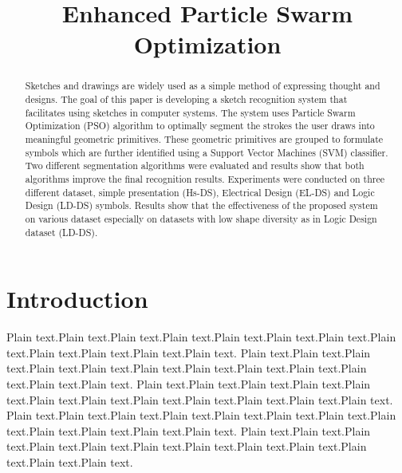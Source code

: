 \documentclass[10pt]{article}
\title{Enhanced Particle Swarm Optimization}
\begin{document}
\maketitle
\begin{abstract}
Sketches and drawings are widely used as a simple method of expressing thought and designs. The goal of this paper is developing a sketch recognition system that facilitates using sketches in computer systems. The system uses Particle Swarm Optimization (PSO) algorithm to optimally segment the strokes the user draws into meaningful geometric primitives.  These geometric primitives are grouped to formulate symbols which are further identified using a Support Vector Machines (SVM) classifier. Two different segmentation algorithms were evaluated and results show that both algorithms improve the final recognition results. Experiments were conducted on three different dataset, simple presentation (Hs-DS), Electrical Design (EL-DS) and Logic Design (LD-DS) symbols. Results show that the effectiveness of the proposed system on various dataset especially on datasets with low shape diversity as in Logic Design dataset (LD-DS).  %
\end{abstract}
\section{Introduction}

 

Plain text.Plain text.Plain text.Plain text.Plain text.Plain text.Plain text.Plain text.Plain text.Plain text.Plain text.Plain text.
Plain text.Plain text.Plain text.Plain text.Plain text.Plain text.Plain text.Plain text.Plain text.Plain text.Plain text.Plain text.
Plain text.Plain text.Plain text.Plain text.Plain text.Plain text.Plain text.Plain text.Plain text.Plain text.Plain text.Plain text.
Plain text.Plain text.Plain text.Plain text.Plain text.Plain text.Plain text.Plain text.Plain text.Plain text.Plain text.Plain text.
Plain text.Plain text.Plain text.Plain text.Plain text.Plain text.Plain text.Plain text.Plain text.Plain text.Plain text.Plain text.
\end{document}
